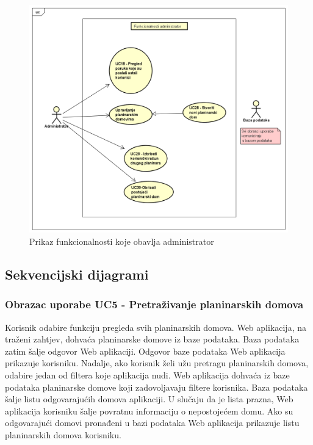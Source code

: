 		\begin{figure}[H]
			\includegraphics[scale=0.5]{dijagrami/administrator-funkcionalnosti.png} %
			\centering
			\caption{Prikaz funkcionalnosti koje obavlja administrator}
			\label{fig:UC dijagrami}
		\end{figure}
				
				
			\newpage	
				
			\subsection{Sekvencijski dijagrami}
			
			\subsubsection{Obrazac uporabe UC5 - Pretraživanje planinarskih domova}
			
			Korisnik odabire funkciju pregleda svih planinarskih domova. Web aplikacija, na traženi zahtjev, dohvaća planinarske domove iz baze podataka. Baza podataka zatim šalje odgovor Web aplikaciji. Odgovor baze podataka Web aplikacija prikazuje korisniku. Nadalje, ako korisnik želi užu pretragu               planinarskih domova, odabire jedan od filtera koje aplikacija nudi. Web aplikacija dohvaća iz baze podataka planinarske domove koji zadovoljavaju filtere korisnika. Baza podataka šalje listu odgovarajućih domova aplikaciji. U slučaju da je lista prazna, Web aplikacija korisniku šalje povratnu informaciju o nepostojećem domu. Ako su odgovarajući domovi pronađeni u bazi podataka Web aplikacija prikazuje listu planinarskih domova korisniku. 
				
